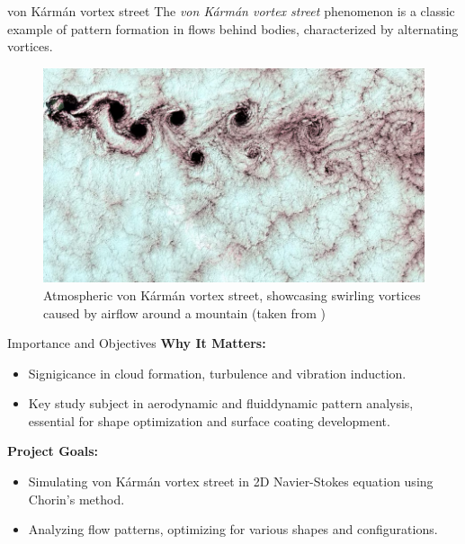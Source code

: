 \begin{frame}{von Kármán vortex street}
    The \textit{von Kármán vortex street} phenomenon is a classic example of pattern formation in flows behind bodies, characterized by alternating vortices. 

    \begin{figure}
        \centering
        \includegraphics[width=0.6\linewidth]{graphics/example_atmos.png}
        \caption{Atmospheric von Kármán vortex street, showcasing swirling vortices caused by airflow around a mountain (taken from \autocite{wiki})}
        \label{fig:example_vortices}
    \end{figure}
\end{frame}

\begin{frame}{Importance and Objectives}
    \textbf{Why It Matters:}
    \begin{itemize}
        \item Signigicance in cloud formation, turbulence and vibration induction.
        \item Key study subject in aerodynamic and fluiddynamic pattern analysis, essential for shape optimization and surface coating development.
    \end{itemize}
    
    \textbf{Project Goals:}
    \begin{itemize}
        \item Simulating von Kármán vortex street in 2D Navier-Stokes equation using Chorin's method.
        \item Analyzing flow patterns, optimizing for various shapes and configurations.
    \end{itemize}
\end{frame}


